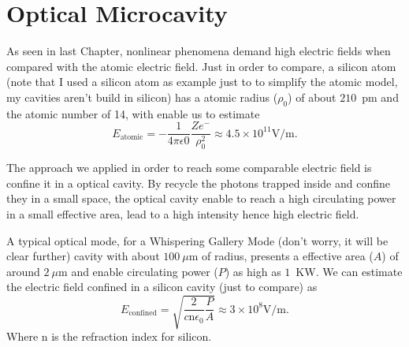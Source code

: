 \chapter{Optical Microcavity}
%
%

As seen in last Chapter, nonlinear phenomena demand high electric fields when compared with the atomic electric field. Just in order to compare, a silicon atom (note that I used a silicon atom as example just to to simplify the atomic model, my cavities aren't build in silicon) has a atomic radius ($\rho_0$) of about $210$~pm and the atomic number of 14, with enable us to estimate   
\begin{equation}
   E_\text{atomic} = -\frac{1}{4 \pi \epsilon0}\frac{Z e^-}{\rho_0^2} %
    \approx 4.5\times10^{11}\text{V/m}.
\end{equation}

The approach we applied in order to reach some comparable electric field is confine it in a optical cavity. By recycle the photons trapped inside and confine they in a small space, the optical cavity enable to reach a high circulating power in a small effective area, lead to a high intensity hence high electric field. 

A typical optical mode, for a Whispering Gallery Mode (don't worry, it will be clear further) cavity with about $100~\mu$m of radius, presents a effective area ($A$) of around $2~\mu$m and enable circulating power ($P$) as high as $1$~KW. We can estimate the electric field confined in a silicon cavity (just to compare) as 
\begin{equation}
    E_\text{confined} = \sqrt{\frac{2}{c\text{n}\epsilon_0}\frac{P}{A}} \approx 3 \times 10^8\text{V/m}.
\end{equation}
Where $\text{n}$ is the refraction index for silicon. 

